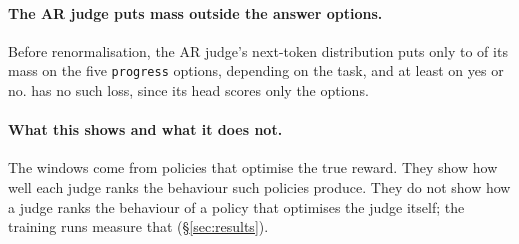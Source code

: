 \paragraph{The AR judge puts mass outside the answer options.} Before renormalisation, the AR judge's next-token
distribution puts only  to  of its mass on the five
\texttt{progress} options, depending on the task, and at least  on yes or no. \kev{} has no
such loss, since its head scores only the options.

\paragraph{What this shows and what it does not.} The windows come from policies that optimise the true reward. They
show how well each judge ranks the behaviour such policies produce. They do not show how a judge ranks the behaviour of
a policy that optimises the judge itself; the training runs measure that (\S\ref{sec:results}).
